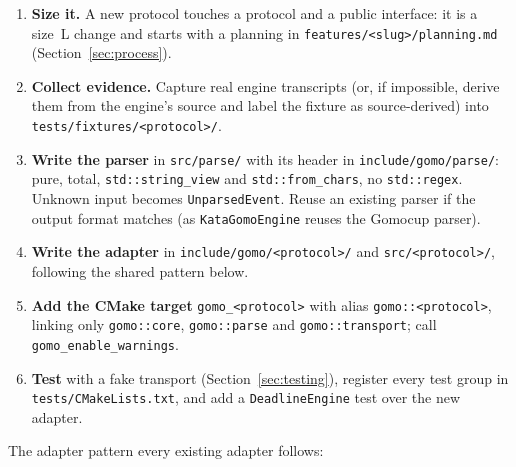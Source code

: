 \documentclass[11pt,a4paper]{article}
\newcommand{\code}[1]{\texttt{#1}}
\newcommand{\file}[1]{\texttt{#1}}
\begin{document}
\begin{enumerate}
  \item \textbf{Size it.} A new protocol touches a protocol and a public interface: it is a size~L
        change and starts with a planning in \file{features/<slug>/planning.md}
        (Section~\ref{sec:process}).
  \item \textbf{Collect evidence.} Capture real engine transcripts (or, if impossible, derive them
        from the engine's source and label the fixture as source-derived) into
        \file{tests/fixtures/<protocol>/}.
  \item \textbf{Write the parser} in \file{src/parse/} with its header in
        \file{include/gomo/parse/}: pure, total, \code{std::string\_view} and
        \code{std::from\_chars}, no \code{std::regex}. Unknown input becomes \code{UnparsedEvent}.
        Reuse an existing parser if the output format matches (as \code{KataGomoEngine} reuses the
        Gomocup parser).
  \item \textbf{Write the adapter} in \file{include/gomo/<protocol>/} and \file{src/<protocol>/},
        following the shared pattern below.
  \item \textbf{Add the CMake target} \code{gomo\_<protocol>} with alias
        \code{gomo::<protocol>}, linking only \code{gomo::core}, \code{gomo::parse} and
        \code{gomo::transport}; call \code{gomo\_enable\_warnings}.
  \item \textbf{Test} with a fake transport (Section~\ref{sec:testing}), register every test group in
        \file{tests/CMakeLists.txt}, and add a \code{DeadlineEngine} test over the new adapter.
\end{enumerate}

\noindent The adapter pattern every existing adapter follows:
\end{document}
